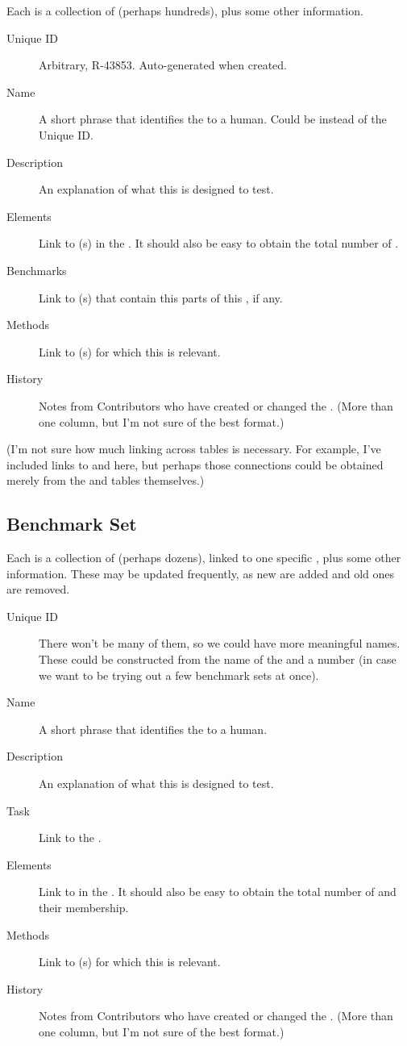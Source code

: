 Each \Refset is a collection of \Elements (perhaps hundreds), plus some other information.

\begin{description}
    \item[Unique ID] Arbitrary, \eg R-43853.  Auto-generated when created.
    \item[Name] A short phrase that identifies the \Refset to a human.  Could be instead of the Unique ID.
    \item[Description] An explanation of what this \Refset is designed to test.
    \item[Elements] Link to \Element(s) in the \Refset.  It should also be easy to obtain the total number of \Elements.
    \item[Benchmarks] Link to \Benchmark(s) that contain this parts of this \Refset, if any.
    \item[Methods] Link to \Method(s) for which this \Refset is relevant.
    \item[History] Notes from Contributors who have created or changed the \Refset.  (More than one column, but I'm not sure of the best format.)
\end{description}

(I'm not sure how much linking across tables is necessary.
For example, I've included links to \Benchmark and \Method here, but perhaps those connections could be obtained merely from the \Benchmark and \Method tables themselves.)

\subsection{Benchmark Set}
\label{sec:tables_benchmark}

Each \Benchmark is a collection of \Elements (perhaps dozens), linked to one specific \Task, plus some other information.
These may be updated frequently, as new \Elements are added and old ones are removed.

\begin{description}
    \item[Unique ID] There won't be many of them, so we could have more meaningful names.  These could be constructed from the name of the \Task and a number (in case we want to be trying out a few benchmark sets at once).
    \item[Name] A short phrase that identifies the \Benchmark to a human.
    \item[Description] An explanation of what this \Benchmark is designed to test.
    \item[Task] Link to the \Task.
    \item[Elements] Link to \Element in the \Benchmark.  It should also be easy to obtain the total number of \Elements and their \Refset membership.
    \item[Methods] Link to \Method(s) for which this \Benchmark is relevant.
    \item[History] Notes from Contributors who have created or changed the \Benchmark.  (More than one column, but I'm not sure of the best format.)
\end{description}

